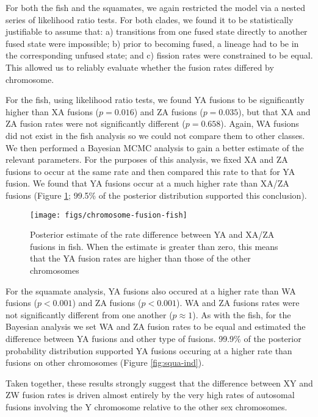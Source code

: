 For both the fish and the squamates, we again restricted the model via a nested series of likelihood ratio tests. For both clades, we found it to be statistically justifiable to assume that: a) transitions from one fused state directly to another fused state were impossible; b) prior to becoming fused, a lineage had to be in the corresponding unfused state; and c) fission rates were constrained to be equal. This allowed us to reliably evaluate whether the fusion rates differed by chromosome.

For the fish, using likelihood ratio tests, we found YA fusions to be significantly higher than XA fusions ($p=\text{0.016}$) and ZA fusions ($p=\text{0.035}$), but that XA and ZA fusion rates were not significantly different ($p=\text{0.658}$). Again, WA fusions did not exist in the fish analysis so we could not compare them to other classes. We then performed a Bayesian MCMC analysis to gain a better estimate of the relevant parameters. For the purposes of this analysis, we fixed XA and ZA fusions to occur at the same rate and then compared this rate to that for YA fusion. We found that YA fusions occur at a much higher rate than XA/ZA fusions (Figure \ref{fig:fish-ind}; 99.5\% of the posterior distribution supported this conclusion).

\begin{figure}[p]
\centering
\texttt{[image: figs/chromosome-fusion-fish]}
\caption[Difference in fusion rate between Y chromosomes and X/Z chromosomes in fish] {Posterior estimate of the rate difference between YA and XA/ZA fusions in fish. When the estimate is greater than zero, this means that the YA fusion rates are higher than those of the other chromosomes}
\label{fig:fish-ind}
\end{figure}

For the squamate analysis, YA fusions also occured at a higher rate than WA fusions ($p<\text{0.001}$) and ZA fusions ($p<\text{0.001}$). WA and ZA fusions rates were not significantly different from one another ($p\approx \text{1}$). As with the fish, for the Bayesian analysis we set WA and ZA fusion rates to be equal and estimated the difference between YA fusions and other type of fusions. 99.9\% of the posterior probability distribution supported YA fusions occuring at a higher rate than fusions on other chromosomes (Figure \ref{fig:squa-ind}). 

Taken together, these results strongly suggest that the difference between XY and ZW fusion rates is driven almost entirely by the very high rates of autosomal fusions involving the Y chromosome relative to the other sex chromosomes.

